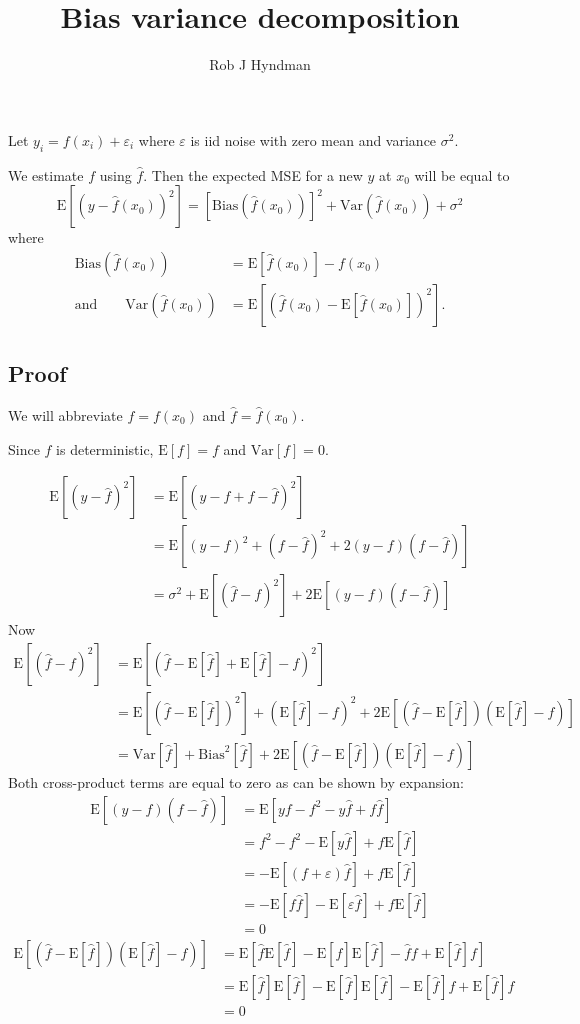 \documentclass[11pt]{article}
\title{Bias variance decomposition}
\author{Rob J Hyndman}
\def\E{\text{E}}
\def\var{\text{Var}}
\def\bias{\text{Bias}}
\begin{document}

\maketitle

Let $y_i = f(x_i) + \varepsilon_i$ where $\varepsilon$ is iid noise with zero mean and variance $\sigma^2$.

We estimate $f$ using $\hat{f}$. Then the expected MSE for a new $y$ at $x_0$ will be equal to
\[
\E[(y-\hat{f}(x_0))^2] = [\bias(\hat{f}(x_0))]^2 + \var(\hat{f}(x_0)) + \sigma^2
\]
where
\begin{align*}
\bias(\hat{f}(x_0)) &= \E[\hat{f}(x_0)] - f(x_0)\\
\text{and}\qquad
 \var(\hat{f}(x_0)) &= \E\left[\left(\hat{f}(x_0) - \E[\hat{f}(x_0)]\right)^2\right].
\end{align*}


\subsection*{Proof}
We will abbreviate $f=f(x_0)$ and $\hat{f}=\hat{f}(x_0)$.

Since $f$ is deterministic, $\E[f]=f$ and $\text{Var}[f]=0$.

\begin{align*}
\E[(y-\hat{f})^2] &= \E[(y - f + f - \hat{f} )^2] \\
  &= \E[(y - f)^2 + (f - \hat{f} )^2 + 2(y-f)(f-\hat{f})] \\
  &= \sigma^2 + \E[(\hat{f} - f)^2] + 2\E[(y-f)(f-\hat{f})] 
\end{align*}
Now
\begin{align*}
\E[(\hat{f}-f)^2] &= \E[(\hat{f} - \E[\hat{f}] + \E[\hat{f}] - f)^2] \\
  &= \E[(\hat{f} - \E[\hat{f}])^2] + (\E[\hat{f}] - f)^2 + 2\E[(\hat{f} - \E[\hat{f}])(\E[\hat{f}] - f)] \\
  &= \var[\hat{f}] + \bias^2[\hat{f}] + 2\E[(\hat{f} - \E[\hat{f}])(\E[\hat{f}] - f)] 
\end{align*}
Both cross-product terms are equal to zero as can be shown by expansion:
\begin{align*}
\E[(y-f)(f-\hat{f})] &= \E[yf - f^2 -y\hat{f} + f\hat{f}] \\
  &= f^2 - f^2 - \E[y\hat{f}] + f\E[\hat{f}] \\
  &= - \E[(f+\varepsilon)\hat{f}] + f\E[\hat{f}] \\
  &= -\E[f\hat{f}] -\E[\varepsilon\hat{f}] + f\E[\hat{f}] \\
  &= 0
\end{align*}
\begin{align*}
\E[(\hat{f} - \E[\hat{f}])(\E[\hat{f}] - f)] 
  &= \E\left[\hat{f}\E[\hat{f}] - \E[\hat{f}]\E[\hat{f}] - \hat{f}f + \E[\hat{f}]f\right]\\
  &= \E[\hat{f}]\E[\hat{f}] - \E[\hat{f}]\E[\hat{f}] - \E[\hat{f}]f + \E[\hat{f}]f\\
  &= 0
\end{align*}
\end{document}
